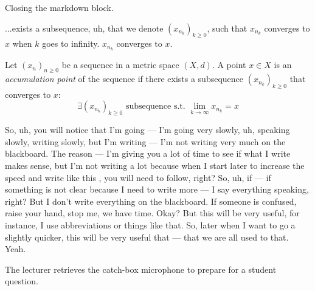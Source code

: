  Closing the markdown block.


\begin{spoken-clean}[00:00:00 - 00:00:35]
 ...exists a subsequence, uh, that we denote $(x_{n_k})_{k \ge 0}$, such that $x_{n_k}$ converges to $x$ when $k$ goes to infinity.  $x_{n_k}$ converges to $x$.
\end{spoken-clean}

\begin{math-stroke}
\begin{definition}\label{def:accumulation-point-seq}
Let $(x_n)_{n \ge 0}$ be a sequence in a metric space $(X, d)$. A point $x \in X$ is an \emph{accumulation point} of the sequence if there exists a subsequence $(x_{n_k})_{k \ge 0}$ that converges to $x$:
\[ \exists (x_{n_k})_{k \ge 0} \text{ subsequence s.t. } \lim_{k \to \infty} x_{n_k} = x \]
\end{definition}
\end{math-stroke}

\begin{spoken-clean}[00:00:36 - 00:01:43]
So, uh, you will notice that I'm going — I'm going very slowly, uh, speaking slowly, writing slowly, but I'm writing — I'm not writing very much on the blackboard. The reason — I'm giving you a lot of time to see if what I write makes sense, but I'm not writing a lot because when I start later to increase the speed and write like this , you will need to follow, right? So, uh, if — if something is not clear because I need to write more — I say everything speaking, right? But I don't write everything on the blackboard. If someone is confused, raise your hand, stop me, we have time. Okay? But this will be very useful, for instance, I use abbreviations or things like that. So, later when I want to go a slightly quicker, this will be very useful that — that we are all used to that. Yeah.
\end{spoken-clean}

\begin{meta-note}
The lecturer retrieves the catch-box microphone to prepare for a student question.
\end{meta-note}

